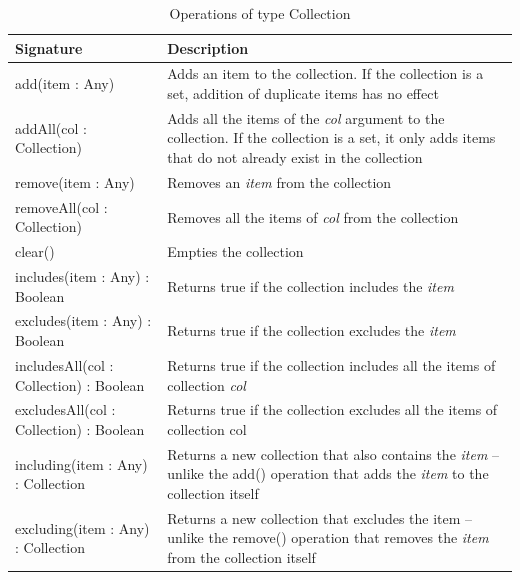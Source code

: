 \begin{longtabu} {|p{6.5cm}|X|}
			
			\caption{Operations of type Collection}
			\label{tab:Collection Operations}\\
			
			\hline
							
			\textbf{Signature} & \textbf{Description} \\\hline

			add(item : Any) & Adds an item to the collection. If the collection is a set, addition of duplicate items has no effect \\\hline
			
			addAll(col : Collection) & Adds all the items of the \emph{col} argument to the collection. If the collection is a set, it only adds items that do not already exist in the collection\\\hline
		
			remove(item : Any) & Removes an \emph{item} from the collection \\\hline
			
			removeAll(col : Collection) & Removes all the items of \emph{col} from the collection \\\hline
			
			clear() & Empties the collection \\\hline
			
			includes(item : Any) : Boolean & Returns true if the collection includes the \emph{item} \\\hline
			
			excludes(item : Any) : Boolean & Returns true if the collection excludes the \emph{item} \\\hline
			
			includesAll(col : Collection) : Boolean & Returns true if the collection includes all the items of collection \emph{col} \\\hline
			
			excludesAll(col : Collection) : Boolean & Returns true if the collection excludes all the items of collection col \\\hline
			
			including(item : Any) : Collection & Returns a new collection that also contains the \emph{item} -- unlike the add() operation that adds the \emph{item} to the collection itself  \\\hline
			
			excluding(item : Any) : Collection & Returns a new collection that excludes the item -- unlike the remove() operation that removes the \emph{item} from the collection itself\\\hline
			

\end{longtabu}
